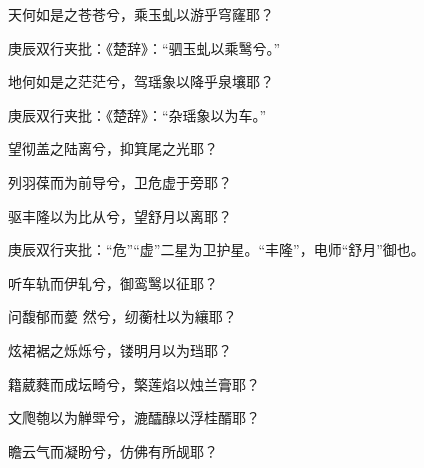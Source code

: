 \begin{poem}

    \begin{pl}

        天何如是之苍苍兮，乘玉虬以游乎穹窿耶？\begin{note}庚辰双行夹批：《楚辞》：“驷玉虬以乘鹥兮。”\end{note}
    \end{pl}
    \begin{pl}

        地何如是之茫茫兮，驾瑶象以降乎泉壤耶？\begin{note}庚辰双行夹批：《楚辞》：“杂瑶象以为车。”\end{note}
    \end{pl}
    \begin{pl}

        望彻盖之陆离兮，抑箕尾之光耶？
    \end{pl}
    \begin{pl}

        列羽葆而为前导兮，卫危虚于旁耶？
    \end{pl}
    \begin{pl}

        驱丰隆以为比从兮，望舒月以离耶？\begin{note}庚辰双行夹批：“危”“虚”二星为卫护星。“丰隆”，电师“舒月”御也。\end{note}
    \end{pl}
    \begin{pl}

        听车轨而伊轧兮，御鸾鹥以征耶？
    \end{pl}
    \begin{pl}

        问馥郁而薆
        然兮，纫蘅杜以为纕耶？
    \end{pl}
    \begin{pl}

        炫裙裾之烁烁兮，镂明月以为珰耶？
    \end{pl}
    \begin{pl}

        籍葳蕤而成坛畸兮，檠莲焰以烛兰膏耶？
    \end{pl}
    \begin{pl}

        文爮匏以为觯斝兮，漉醽醁以浮桂醑耶？
    \end{pl}
    \begin{pl}

        瞻云气而凝盼兮，仿佛有所觇耶？
    \end{pl}
    \begin{pl}


\end{pl}
\end{poem}
